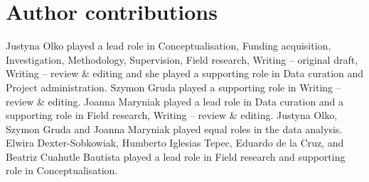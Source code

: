 \documentclass[output=paper,hidelinks]{langscibook}
\begin{document}
\section*{Author contributions}

Justyna Olko played a lead role in Conceptualisation, Funding acquisition, Investigation, Methodology, Supervision, Field research, Writing – original draft, Writing – review {\&} editing and she played a supporting role in Data curation and Project administration. Szymon Gruda played a supporting role in Writing – review {\&} editing. Joanna Maryniak played a lead role in Data curation and a supporting role in Field research, Writing – review {\&} editing. Justyna Olko, Szymon Gruda and Joanna Maryniak played equal roles in the data analysis. Elwira Dexter-Sobkowiak, Humberto Iglesias Tepec, Eduardo de la Cruz, and Beatriz Cuahutle Bautista played a lead role in Field research and supporting role in Conceptualisation.

\sloppy
\printbibliography[heading=subbibliography,notkeyword=this]
\clearpage
\end{document}
